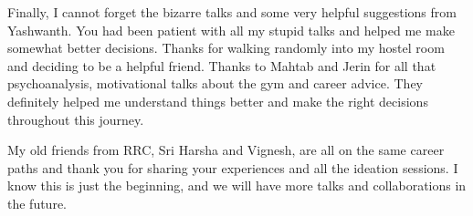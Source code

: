 \documentclass[english,a4paper,11pt,twoside]{StyleThese}
\begin{document}
Finally, I cannot forget the bizarre talks and some very helpful suggestions from Yashwanth. You had been patient with all my stupid talks and helped me make somewhat better decisions. Thanks for walking randomly into my hostel room and deciding to be a helpful friend. Thanks to Mahtab and Jerin for all that psychoanalysis, motivational talks about the gym and career advice. They definitely helped me understand things better and make the right decisions throughout this journey.

My old friends from RRC, Sri Harsha and Vignesh, are all on the same career paths and thank you for sharing your experiences and all the ideation sessions. I know this is just the beginning, and we will have more talks and collaborations in the future.




\tableofcontents

\printnoidxglossary[type=\acronymtype]
%

\mainmatter


% 
% 
% 
% 
% 


\appendix



% 


% 
% 




\end{document}
